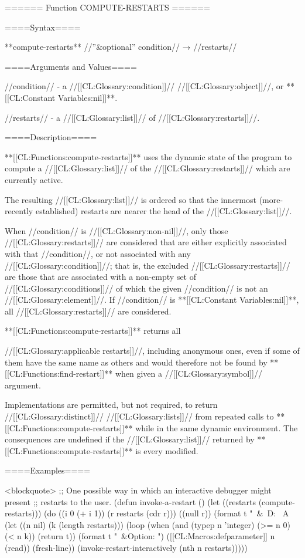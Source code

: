 ====== Function COMPUTE-RESTARTS ======

====Syntax====

**compute-restarts** //''&optional'' condition// → //restarts//

====Arguments and Values====

//condition// - a //[[CL:Glossary:condition]]// //[[CL:Glossary:object]]//, or **[[CL:Constant Variables:nil]]**.

//restarts// - a //[[CL:Glossary:list]]// of //[[CL:Glossary:restarts]]//.

====Description====

**[[CL:Functions:compute-restarts]]** uses the dynamic state of the program to compute a //[[CL:Glossary:list]]// of the //[[CL:Glossary:restarts]]// which are currently active.

The resulting //[[CL:Glossary:list]]// is ordered so that the innermost (more-recently established) restarts are nearer the head of the //[[CL:Glossary:list]]//.

When //condition// is //[[CL:Glossary:non-nil]]//, only those //[[CL:Glossary:restarts]]// are considered that are either explicitly associated with that //condition//, or not associated with any //[[CL:Glossary:condition]]//; that is, the excluded //[[CL:Glossary:restarts]]// are those that are associated with a non-empty set of //[[CL:Glossary:conditions]]// of which the given //condition// is not an //[[CL:Glossary:element]]//. If //condition// is **[[CL:Constant Variables:nil]]**, all //[[CL:Glossary:restarts]]// are considered.

**[[CL:Functions:compute-restarts]]** returns all

//[[CL:Glossary:applicable restarts]]//, including anonymous ones, even if some of them have the same name as others and would therefore not be found by **[[CL:Functions:find-restart]]** when given a //[[CL:Glossary:symbol]]// argument.

Implementations are permitted, but not required, to return //[[CL:Glossary:distinct]]// //[[CL:Glossary:lists]]// from repeated calls to **[[CL:Functions:compute-restarts]]** while in the same dynamic environment. The consequences are undefined if the //[[CL:Glossary:list]]// returned by **[[CL:Functions:compute-restarts]]** is every modified.

====Examples====

<blockquote> ;; One possible way in which an interactive debugger might present ;; restarts to the user. (defun invoke-a-restart () (let ((restarts (compute-restarts))) (do ((i 0 (+ i 1)) (r restarts (cdr r))) ((null r)) (format t "~&~D: ~A~ (let ((n nil) (k (length restarts))) (loop (when (and (typep n 'integer) (>= n 0) (< n k)) (return t)) (format t "~&Option: ") ([[CL:Macros:defparameter]] n (read)) (fresh-line)) (invoke-restart-interactively (nth n restarts)))))

